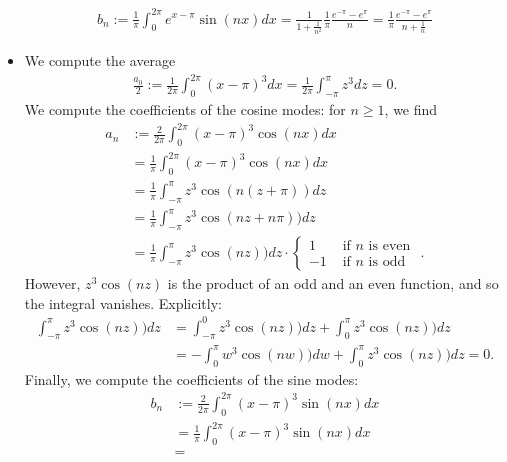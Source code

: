 \documentclass[11pt]{article}
\begin{document}
\begin{solution}
\begin{itemize}
\begin{align*}
            b_n:= \frac{1}{\pi}
                    \int_{0}^{2\pi} e^{x - \pi} \sin(n x) dx = \frac{1}{1 + \frac{1}{n^2}} \frac{1}{\pi}\frac{e^{-\pi} - e^{\pi}}{n} = \frac{1}{\pi}  \frac{e^{-\pi} - e^{\pi}}{n + \frac{1}{n}}
        \end{align*}
    \item
    We compute the average 
    \begin{align*}
        \frac{a_0}{2}
        :=
        \frac{1}{2\pi} \int_{0}^{2\pi} (x-\pi)^{3} dx
        =
        \frac{1}{2\pi} \int_{-\pi}^{\pi} z^{3} dz
        =
        0
        .
    \end{align*}
    We compute the coefficients of the cosine modes: for $n \geq 1$, we find 
    \begin{align*}
        a_n
        &:=
        \frac{2}{2\pi} \int_{0}^{2\pi} (x-\pi)^{3} \cos(nx) dx
        \\&=
        \frac{1}{\pi} \int_{0}^{2\pi} (x-\pi)^{3} \cos(nx) dx
        \\&=
        \frac{1}{\pi} \int_{-\pi}^{\pi} z^{3} \cos(n(z+\pi)) dz
        \\&=
        \frac{1}{\pi} \int_{-\pi}^{\pi} z^{3} \cos(nz+n\pi)) dz
        \\&=
        \frac{1}{\pi} \int_{-\pi}^{\pi} z^{3} \cos(nz)) dz
        \cdot \left\{\begin{array}{ll} 1 & \text{ if $n$ is even } \\ -1 & \text{ if $n$ is odd } \end{array}\right.
        .
    \end{align*}
    However, $z^3 \cos(nz)$ is the product of an odd and an even function, and so the integral vanishes. 
    Explicitly:
    \begin{align*}
        \int_{-\pi}^{\pi} z^{3} \cos(nz)) dz
        &=
        \int_{-\pi}^{0} z^{3} \cos(nz)) dz
        + 
        \int_{0}^{\pi} z^{3} \cos(nz)) dz
        \\&=
        - 
        \int_{0}^{\pi} w^{3} \cos(nw)) dw
        + 
        \int_{0}^{\pi} z^{3} \cos(nz)) dz
        = 
        0.
    \end{align*}
    Finally, we compute the coefficients of the sine modes:
    \begin{align*}
        b_n
        &:=
        \frac{2}{2\pi} \int_{0}^{2\pi} (x-\pi)^{3} \sin(nx) dx
        \\&=
        \frac{1}{\pi} \int_{0}^{2\pi} (x-\pi)^{3} \sin(nx) dx
        \\&=

\end{align*}
\end{itemize}
\end{solution}
\end{document}
